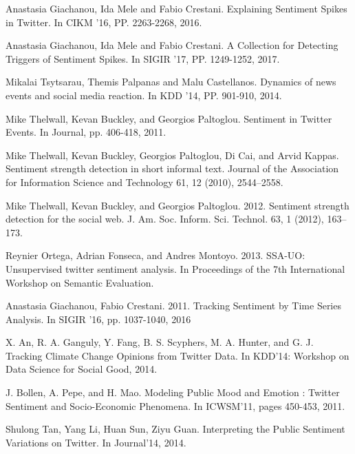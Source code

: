 \documentclass[runningheads]{llncs}
\begin{document}
\begin{thebibliography}{8}

Anastasia Giachanou, Ida Mele and Fabio Crestani.
\newblock  Explaining Sentiment Spikes in Twitter.
\newblock In CIKM ’16, PP. 2263-2268, 2016.

Anastasia Giachanou, Ida Mele and Fabio Crestani.
\newblock  A Collection for Detecting Triggers of Sentiment Spikes.
\newblock In SIGIR ’17, PP. 1249-1252, 2017.

Mikalai Tsytsarau, Themis Palpanas and Malu Castellanos.
\newblock  Dynamics of news events and social media reaction.
\newblock In KDD ’14, PP. 901-910, 2014.

Mike Thelwall, Kevan Buckley, and Georgios Paltoglou.
\newblock Sentiment in Twitter Events.
\newblock In Journal, pp. 406-418, 2011.

Mike Thelwall, Kevan Buckley, Georgios Paltoglou, Di Cai, and Arvid Kappas.
\newblock Sentiment strength detection in short informal text.
\newblock Journal of the Association for Information Science and Technology 61, 12 (2010), 2544–2558.

Mike Thelwall, Kevan Buckley, and Georgios Paltoglou. 2012.
\newblock Sentiment strength detection for the social web.
\newblock J. Am. Soc. Inform. Sci. Technol. 63, 1 (2012), 163–173.

Reynier Ortega, Adrian Fonseca, and Andres Montoyo. 2013.
\newblock SSA-UO: Unsupervised twitter sentiment analysis.
\newblock In Proceedings of the 7th International Workshop on Semantic Evaluation.

Anastasia Giachanou, Fabio Crestani. 2011.
\newblock Tracking Sentiment by Time Series Analysis.
\newblock In SIGIR ’16, pp. 1037-1040, 2016

X. An, R. A. Ganguly, Y. Fang, B. S. Scyphers, M. A. Hunter, and G. J.
\newblock Tracking Climate Change Opinions from Twitter Data. 
\newblock In KDD’14: Workshop on Data Science for Social Good, 2014.

J. Bollen, A. Pepe, and H. Mao.
\newblock Modeling Public Mood and Emotion : Twitter Sentiment and Socio-Economic Phenomena. 
\newblock In ICWSM’11, pages 450-453, 2011.

Shulong Tan, Yang Li, Huan Sun, Ziyu Guan.
\newblock Interpreting the Public Sentiment Variations on Twitter. 
\newblock In Journal’14, 2014.


\end{thebibliography}
\end{document}
